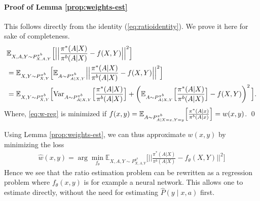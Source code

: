 \paragraph{Proof of Lemma \ref{prop:weights-est}}
This follows directly from the identity (\ref{eq:ratioidentity}). We prove it here for sake of completeness.
\begin{align}
    &\mathbb{E}_{X,A,Y \sim P^{\pi^b}_{X,A,Y}} \Big[\Big|\Big|\frac{\pi^{\ast}(A|X)}{\pi^b (A|X)}-f(X,Y)\Big|\Big|^2\Big] \nonumber \\
    &= \mathbb{E}_{X,Y \sim P^{\pi^b}_{X,Y}} \Big[\mathbb{E}_{A \sim P^{\pi^b}_{A\mid X,Y}} \Big|\Big|\frac{\pi^{\ast}(A|X)}{\pi^b (A|X)}-f(X,Y)\Big|\Big|^2\Big] \nonumber \\
    &= \mathbb{E}_{X,Y \sim P^{\pi^b}_{X,Y}} \Big[\textup{Var}_{A \sim P^{\pi^b}_{A\mid X,Y}}\Big[ \frac{\pi^{\ast}(A|X)}{\pi^b (A|X)} \Big] + \left(\mathbb{E}_{A \sim P^{\pi^b}_{A\mid X,Y}}\Big[ \frac{\pi^{\ast}(A|X)}{\pi^b (A|X)} \Big] - f(X,Y) \right)^2 \Big].
     \label{eq:w-reg}
\end{align}
Where, \eqref{eq:w-reg} is minimized if $f(x, y) = \mathbb{E}_{A \sim P^{\pi^b}_{A\mid X=x,Y=y}}\Big[ \frac{\pi^{\ast}(A|x)}{\pi^b (A|x)} \Big] = w(x,y)$.
\qed

Using Lemma \ref{prop:weights-est}, we can thus approximate $w(x,y)$ by minimizing the loss
\begin{align}
    \hat{w}(x, y) =\arg \min_{f_\theta} \mathbb{E}_{X,A,Y \sim P^{\pi^b}_{X,A,Y}} \Big[\Big|\Big|\frac{\pi^{\ast}(A|X)}{\pi^b (A|X)}-f_\theta(X,Y)\Big|\Big|^2\Big] \label{eq:weights-loss}
\end{align}
Hence we see that the ratio estimation problem can be rewritten as a regression problem where $f_\theta(x,y)$ is for example a neural network. This allows one to estimate directly, without the need for estimating $\hat{P}(y\mid x, a)$ first.

%
%

%
%
%
%
%
%
%
%
%
%
%
%
%

%

%


%
%
%
%
%
%
%
%
%
%
%
%

\newpage
